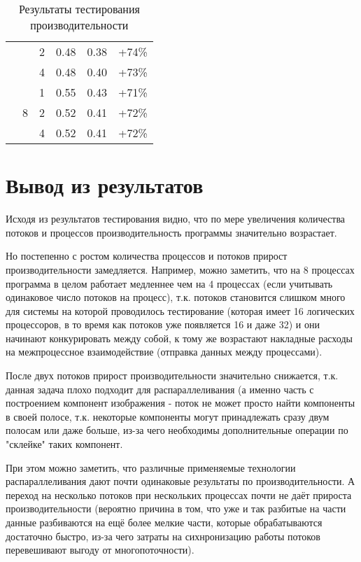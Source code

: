 \documentclass[12pt]{article}
\begin{document}
\begin{table}[H]
\begin{tabular}{|c|c|c|c|c|c|}
                            &                     & 2                & 0.48                  & 0.38               & +74\% \\
                            &                     & 4                & 0.48                  & 0.40               & +73\% \\
\cline{2-6}
                            & \multirow{3}{*}{8}  & 1                & 0.55                  & 0.43               & +71\% \\
                            &                     & 2                & 0.52                  & 0.41               & +72\% \\
                            &                     & 4                & 0.52                  & 0.41               & +72\% \\
\hline
\end{tabular}
\caption{Результаты тестирования производительности}
\end{table}

\newpage

\section{Вывод из результатов}
Исходя из результатов тестирования видно, что по мере увеличения количества потоков и процессов производительность программы значительно возрастает.

Но постепенно с ростом количества процессов и потоков прирост производительности замедляется. Например, можно заметить, что на 8 процессах программа в целом работает медленнее чем на 4 процессах (если учитывать одинаковое число потоков на процесс), т.к. потоков становится слишком много для системы на которой проводилось тестирование (которая имеет 16 логических процессоров, в то время как потоков уже появляется 16 и даже 32) и они начинают конкурировать между собой, к тому же возрастают накладные расходы на межпроцессное взаимодействие (отправка данных между процессами).

После двух потоков прирост производительности значительно снижается, т.к. данная задача плохо подходит для распараллеливания (а именно часть с построением компонент изображения - поток не может просто найти компоненты в своей полосе, т.к. некоторые компоненты могут принадлежать сразу двум полосам или даже больше, из-за чего необходимы дополнительные операции по "склейке" таких компонент.

При этом можно заметить, что различные применяемые технологии распараллеливания дают почти одинаковые результаты по производительности. А переход на несколько потоков при нескольких процессах почти не даёт прироста производительности (вероятно причина в том, что уже и так разбитые на части данные разбиваются на ещё более мелкие части, которые обрабатываются достаточно быстро, из-за чего затраты на сихнронизацию работы потоков перевешивают выгоду от многопоточности).
\end{document}
